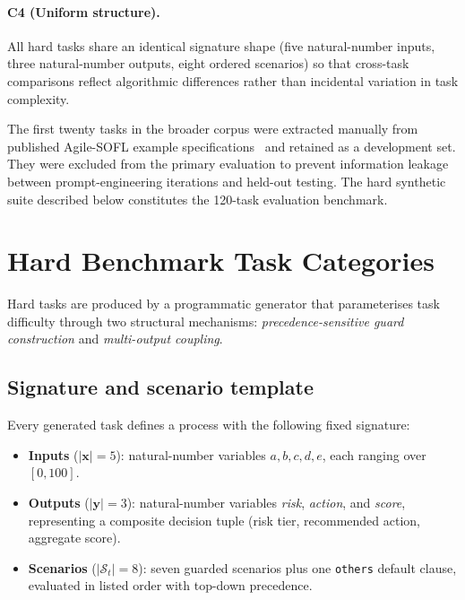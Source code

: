 \paragraph{C4 (Uniform structure).}
All hard tasks share an identical signature shape (five natural-number
inputs, three natural-number outputs, eight ordered scenarios) so that
cross-task comparisons reflect algorithmic differences rather than
incidental variation in task complexity.

The first twenty tasks in the broader corpus were extracted manually from
published Agile-SOFL example specifications~\citep{liu2014sofl,liu2004sofl} and retained as a development set.
They were excluded from the primary evaluation to prevent information leakage
between prompt-engineering iterations and held-out testing.  The hard synthetic
suite described below constitutes the 120-task evaluation benchmark.

\section{Hard Benchmark Task Categories}
\label{sec:bench:categories}

Hard tasks are produced by a programmatic generator that parameterises task
difficulty through two structural mechanisms: \emph{precedence-sensitive
guard construction} and \emph{multi-output coupling}.

\subsection{Signature and scenario template}

Every generated task defines a process with the following fixed signature:

\begin{itemize}
  \item \textbf{Inputs} ($|\mathbf{x}| = 5$): natural-number variables
        $a, b, c, d, e$, each ranging over $[0, 100]$.
  \item \textbf{Outputs} ($|\mathbf{y}| = 3$): natural-number variables
        \textit{risk}, \textit{action}, and \textit{score}, representing a
        composite decision tuple (risk tier, recommended action, aggregate
        score).
  \item \textbf{Scenarios} ($|\mathcal{S}_t| = 8$): seven guarded scenarios
        plus one \texttt{others} default clause, evaluated in listed order
        with top-down precedence.
\end{itemize}


